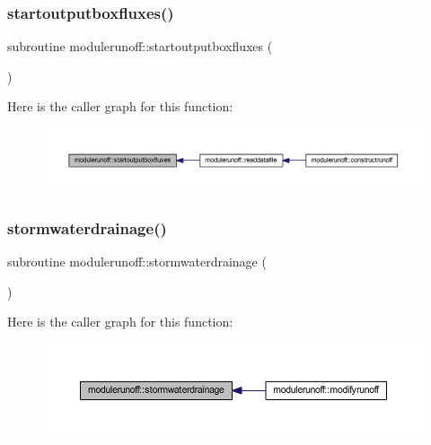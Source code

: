 \subsubsection{\texorpdfstring{startoutputboxfluxes()}{startoutputboxfluxes()}}
{\footnotesize\ttfamily subroutine modulerunoff\+::startoutputboxfluxes (\begin{DoxyParamCaption}{ }\end{DoxyParamCaption})\hspace{0.3cm}{\ttfamily [private]}}

Here is the caller graph for this function\+:\nopagebreak
\begin{figure}[H]
\begin{center}
\leavevmode
\includegraphics[width=350pt]{namespacemodulerunoff_a94b297f6c1f0a65686f92178ebe5d5c2_icgraph}
\end{center}
\end{figure}
\mbox{\label{namespacemodulerunoff_af4d68602fac4df4d58a06a8d87433a3b}} 
\subsubsection{\texorpdfstring{stormwaterdrainage()}{stormwaterdrainage()}}
{\footnotesize\ttfamily subroutine modulerunoff\+::stormwaterdrainage (\begin{DoxyParamCaption}{ }\end{DoxyParamCaption})\hspace{0.3cm}{\ttfamily [private]}}

Here is the caller graph for this function\+:\nopagebreak
\begin{figure}[H]
\begin{center}
\leavevmode
\includegraphics[width=350pt]{namespacemodulerunoff_af4d68602fac4df4d58a06a8d87433a3b_icgraph}
\end{center}
\end{figure}
\mbox{\label{namespacemodulerunoff_a5cc041140596592ca2cd2f67dfadd9a7}} 
